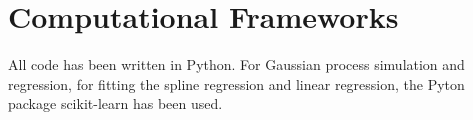 \section{Computational Frameworks}

All code has been written in Python.
For Gaussian process simulation and regression, for fitting the spline regression
and linear regression, the Pyton package scikit-learn
has been used.














